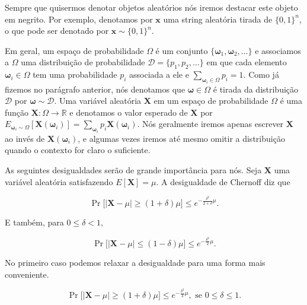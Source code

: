 Sempre que quisermos denotar objetos aleatórios nós iremos destacar este objeto em negrito. Por exemplo, denotamos por $\boldsymbol{x}$ uma string aleatória tirada de $\{0, 1\}^{n}$, o que pode ser denotado por $\boldsymbol{x} \sim \{0, 1\}^{n}$.

Em geral, um espaço de probabilidade $\Omega$ é um conjunto $\{\boldsymbol{\omega}_{1}, \boldsymbol{\omega}_{2}, \dots \}$ e associamos a $\Omega$ uma distribuição de probabilidade $\mathcal{D} = \{p_{1}, p_{2}, \dots \}$ em que cada elemento $\boldsymbol{\omega}_{i} \in \Omega$ tem uma probabilidade $p_{i}$ associada a ele e $\sum_{\boldsymbol{\omega}_{i} \in \Omega} p_{i} = 1$. Como já fizemos no parágrafo anterior, nós denotamos que $\boldsymbol{\omega} \in \Omega$ é tirada da distribuição $\mathcal{D}$ por $\boldsymbol{\omega} \sim \mathcal{D}$. Uma variável aleatória $\boldsymbol{X}$ em um espaço de probabilidade $\Omega$ é uma função $\boldsymbol{X}: \Omega \to \mathbb{R}$ e denotamos o valor esperado de $\boldsymbol{X}$ por $E_{\boldsymbol{\omega}_{i} \sim \Omega}[\boldsymbol{X}(\boldsymbol{\omega}_{i})] = \sum_{\boldsymbol{\omega}_{i}} p_{i}\boldsymbol{X}(\boldsymbol{\omega}_{i})$. Nós geralmente iremos apenas escrever $\boldsymbol{X}$ ao invés de $\boldsymbol{X}(\boldsymbol{\omega}_{i})$, e algumas vezes iremos até mesmo omitir a distribuição quando o contexto for claro o suficiente.

As seguintes desigualdades serão de grande importância para nós. Seja $\boldsymbol{X}$ uma variável aleatória satisfazendo $E[\boldsymbol{X}] = \mu$. A desigualdade de Chernoff diz que

\begin{equation} \label{chernoff_bound_1}
    \Pr \bigg[ \Big\lvert \boldsymbol{X} - \mu \Big\rvert \geq (1 + \delta)\mu \bigg] \leq e^{-\frac{\delta^{2}}{2 + \delta}\mu}.
\end{equation}

E também, para $0 \leq \delta < 1$,

\begin{equation}
    \Pr \bigg[ \Big\lvert \boldsymbol{X} - \mu \Big\rvert \leq (1 - \delta)\mu \bigg] \leq e^{-\frac{\delta^{2}}{2}\mu}.
\end{equation}

No primeiro caso podemos relaxar a desigualdade para uma forma mais conveniente.

\begin{equation*}
    \Pr \bigg[ \Big\lvert \boldsymbol{X} - \mu \Big\rvert \geq (1 + \delta)\mu \bigg] \leq e^{-\frac{\delta^{2}}{3}\mu}, \text{ se } 0 \leq \delta \leq 1.
\end{equation*}


